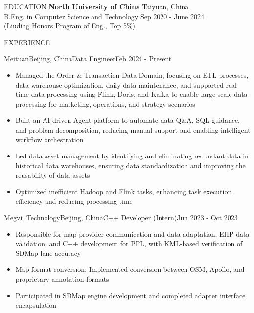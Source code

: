 \documentclass{resume} %
\begin{document}
\linespread{0.95}


\begin{rSection}{EDUCATION}
\textbf{North University of China} \hfill Taiyuan, China\\
B.Eng. in Computer Science and Technology \hfill Sep 2020 - June 2024\\
(Liuding Honors Program of Eng., Top 5\%)
\end{rSection}


\begin{rSection}{EXPERIENCE}

\begin{rSubsection}{Meituan}{Beijing, China}{\textup{Data Engineer}}{\textup{Feb 2024 - Present}}
\begin{itemize}
\setlength\itemsep{-0.5em}
\item Managed the Order \& Transaction Data Domain, focusing on ETL processes, data warehouse optimization, daily data maintenance, and supported real-time data processing using Flink, Doris, and Kafka to enable large-scale data processing for marketing, operations, and strategy scenarios
\item Built an AI-driven Agent platform to automate data Q\&A, SQL guidance, and problem decomposition, reducing manual support and enabling intelligent workflow orchestration
\item Led data asset management by identifying and eliminating redundant data in historical data warehouses, ensuring data standardization and improving the reusability of data assets
\item Optimized inefficient Hadoop and Flink tasks, enhancing task execution efficiency and reducing processing time
\end{itemize}
\end{rSubsection}

\begin{rSubsection}{Megvii Technology}{Beijing, China}{\textup{C++ Developer (Intern)}}{\textup{Jun 2023 - Oct 2023}}
\begin{itemize}
\setlength\itemsep{-0.5em}
\item Responsible for map provider communication and data adaptation, EHP data validation, and \textup{C++} development for PPL, with KML-based verification of SDMap lane accuracy
\item Map format conversion: Implemented conversion between OSM, Apollo, and proprietary annotation formats
\item Participated in SDMap engine development and completed adapter interface encapsulation
\end{itemize}
\end{rSubsection}

\end{rSection}
\end{document}

